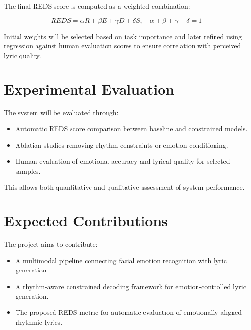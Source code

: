\documentclass[11pt]{article}
\begin{document}
The final REDS score is computed as a weighted combination:

\[
REDS = \alpha R + \beta E + \gamma D + \delta S, \quad \alpha + \beta + \gamma + \delta = 1
\]

Initial weights will be selected based on task importance and later refined using regression against human evaluation scores to ensure correlation with perceived lyric quality.

\section{Experimental Evaluation}

The system will be evaluated through:

\begin{itemize}[leftmargin=*]
    \item Automatic REDS score comparison between baseline and constrained models.
    \item Ablation studies removing rhythm constraints or emotion conditioning.
    \item Human evaluation of emotional accuracy and lyrical quality for selected samples.
\end{itemize}

This allows both quantitative and qualitative assessment of system performance.

\section{Expected Contributions}

The project aims to contribute:

\begin{itemize}[leftmargin=*]
    \item A multimodal pipeline connecting facial emotion recognition with lyric generation.
    \item A rhythm-aware constrained decoding framework for emotion-controlled lyric generation.
    \item The proposed REDS metric for automatic evaluation of emotionally aligned rhythmic lyrics.
\end{itemize}
\end{document}
